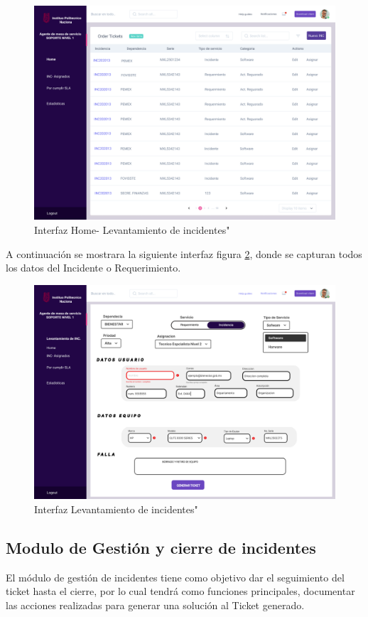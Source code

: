  \begin{figure}[H]
 	\centering
 	\includegraphics[width=1.1\textwidth]{Capitulo4/Img/Levantamiento_inc/home}
 	\caption{Interfaz Home- Levantamiento de incidentes"}
 	\label{fig:IF}
 \end{figure}
A continuación se  mostrara la siguiente interfaz figura \ref{fig:IFHLDI}, donde se capturan todos los datos del Incidente o Requerimiento. 
\begin{figure}[H]
	\centering
	\includegraphics[width=1.1\textwidth]{Capitulo4/Img/Levantamiento_inc/Registro}
	\caption{Interfaz Levantamiento de incidentes"}
	\label{fig:IFHLDI}
\end{figure}
 



\newpage
\subsection{Modulo de Gestión  y cierre de incidentes}
El módulo de gestión de incidentes tiene como objetivo dar el seguimiento del ticket hasta el cierre, por lo cual tendrá como funciones principales, documentar las acciones  realizadas para generar una solución al Ticket generado. 
